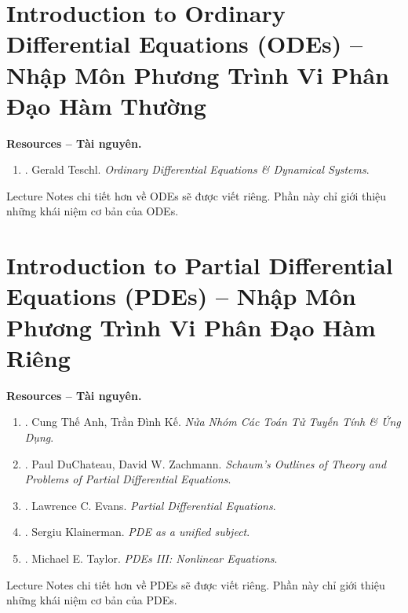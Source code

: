 \documentclass{article}
\begin{document}
\section{Introduction to Ordinary Differential Equations (ODEs) -- Nhập Môn Phương Trình Vi Phân Đạo Hàm Thường}
\textbf{\textsf{Resources -- Tài nguyên.}}
\begin{enumerate}
	\item \cite{Teschl2012}. {\sc Gerald Teschl}. {\it Ordinary Differential Equations \& Dynamical Systems}.
\end{enumerate}
Lecture Notes chi tiết hơn về ODEs sẽ được viết riêng. Phần này chỉ giới thiệu những khái niệm cơ bản của ODEs.


\section{Introduction to Partial Differential Equations (PDEs) -- Nhập Môn Phương Trình Vi Phân Đạo Hàm Riêng}
\textbf{\textsf{Resources -- Tài nguyên.}}
\begin{enumerate}
	\item \cite{Anh_Ke_semigroup}. {\sc Cung Thế Anh, Trần Đình Kế}. {\it Nửa Nhóm Các Toán Tử Tuyến Tính \& Ứng Dụng}.
	
	\item \cite{DuChateau_Zachmann_PDEs}. {\sc Paul DuChateau, David W. Zachmann}. {\it Schaum's Outlines of Theory and Problems of Partial Differential Equations}.
	
	\item \cite{Evans2010}. {\sc Lawrence C. Evans}. {\it Partial Differential Equations}.
	
	\item \cite{Klainerman2000}. {\sc Sergiu Klainerman}. {\it PDE as a unified subject}.
	
	\item \cite{Taylor2011}. {\sc Michael E. Taylor}. {\it PDEs III: Nonlinear Equations}.
\end{enumerate}
Lecture Notes chi tiết hơn về PDEs sẽ được viết riêng. Phần này chỉ giới thiệu những khái niệm cơ bản của PDEs.

\end{document}
